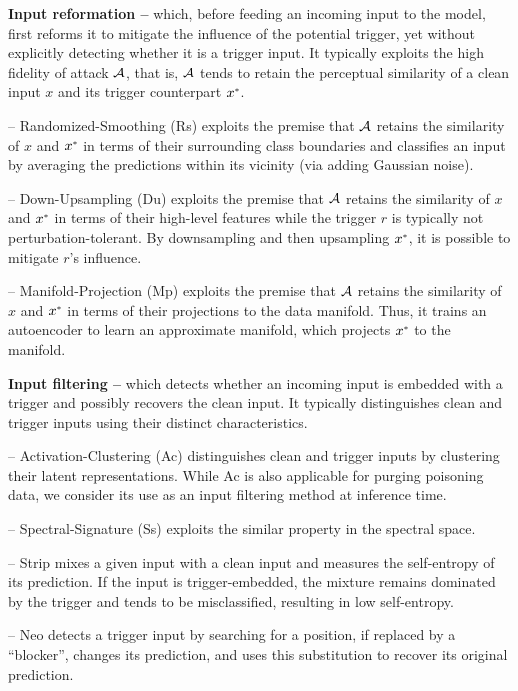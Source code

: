 \documentclass[compsoc,conference,a4paper,10pt,times]{IEEEtran}
\newcommand{\du}{{\sc Du}\xspace}
\newcommand{\strip}{{\sc Strip}\xspace}
\newcommand{\ac}{{\sc Ac}\xspace}
\newcommand{\rands}{{\sc Rs}\xspace}
\newcommand{\neo}{{\sc Neo}\xspace}
\newcommand{\mss}{{\sc Ss}\xspace}
\newcommand{\mmp}{{\sc Mp}\xspace}
\begin{document}
\vspace{2pt}
{\bf Input reformation --} which, before feeding an incoming input to the model, first reforms it to mitigate the influence of the potential trigger, yet without explicitly detecting whether it is a trigger input.
It typically exploits the high fidelity of attack ${\mathcal{A}}$, that is, ${\mathcal{A}}$ tends to retain the perceptual similarity of a clean input $x$ and its trigger counterpart $\ux$.


-- Randomized-Smoothing (\rands) exploits the premise that ${\mathcal{A}}$ retains the similarity of $x$ and $\ux$ in terms of their surrounding class boundaries and classifies an input by averaging the predictions within its vicinity (via adding Gaussian noise).

-- Down-Upsampling (\du) exploits the premise that ${\mathcal{A}}$ retains the similarity of $x$ and $\ux$ in terms of their high-level features while the trigger $r$ is typically not perturbation-tolerant. By downsampling and then upsampling $\ux$, it is possible to mitigate $r$'s influence.

-- Manifold-Projection (\mmp) exploits the premise that ${\mathcal{A}}$ retains the similarity of $x$ and $\ux$ in terms of their projections to the data manifold. Thus, it trains an autoencoder to learn an approximate manifold, which projects $\ux$ to the manifold.

\vspace{2pt}
{\bf Input filtering --} which detects whether an incoming input is embedded with a trigger and possibly recovers the clean input. It typically distinguishes clean and trigger inputs using their distinct characteristics.

-- Activation-Clustering (\ac) distinguishes clean and trigger inputs by clustering their latent representations. While \ac is also applicable for purging poisoning data, we consider its use as an input filtering method at inference time. 

-- Spectral-Signature (\mss) exploits the similar property in the spectral space.

-- {\strip} mixes a given input with a clean input and measures the self-entropy of its prediction. If the input is trigger-embedded, the mixture remains dominated by the trigger and tends to be misclassified, resulting in low self-entropy.

-- {\neo} detects a trigger input by searching for a position, if replaced by a ``blocker'', changes its prediction, and uses this substitution to recover its original prediction. 
\end{document}
